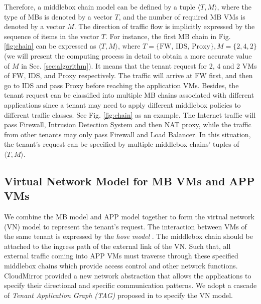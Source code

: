 \documentclass[review]{elsarticle}
\begin{document}
Therefore, a middlebox chain model can be defined by a tuple $\langle T, M \rangle$, where the type of MBs is denoted by a vector $T$, and the number of required MB VMs is denoted by a vector $M$. The direction of traffic flow is implicitly expressed by the sequence of items in the vector $T$. For instance, the first MB chain in Fig. \ref{fig:chain} can be expressed as $\langle T, M \rangle$, where $T=\{\text{FW, IDS, Proxy}\}, M=\{2, 4, 2\}$ (we will present the computing process in detail to obtain a more accurate value of $M$ in Sec. \ref{sec:algorithm}). It means that the tenant request for 2, 4 and 2 VMs of FW, IDS, and Proxy respectively. The traffic will arrive at FW first, and then go to IDS and pass Proxy before reaching the application VMs. Besides, the tenant request can be classified into multiple MB chains associated with different applications \cite{stratos12, M14sap, nfv_challenges} since a tenant may need to apply different middlebox policies to different traffic classes. See Fig. \ref{fig:chain} as an example. The Internet traffic will pass Firewall, Intrusion Detection System and then NAT proxy, while the traffic from other tenants may only pass Firewall and Load Balancer. In this situation, the tenant's request can be specified by multiple middlebox chains' tuples of $\langle T, M \rangle$.

\subsection{Virtual Network Model for MB VMs and APP VMs} 
We combine the MB model and APP model together to form the virtual network (VN) model to represent the tenant's request. The interaction between VMs of the same tenant is expressed by the \emph{hose model} \cite{hose_model}. The middlebox chain should be attached to the ingress path of the external link of the VN. Such that, all external traffic coming into APP VMs must traverse through these specified middlebox chains which provide access control and other network functions. CloudMirror \cite{cloudmirror} provided a new network abstraction that allows the applications to specify their directional and specific communication patterns. We adopt a cascade of \emph{Tenant Application Graph (TAG)} proposed in \cite{cloudmirror} to specify the VN model. 
\end{document}
